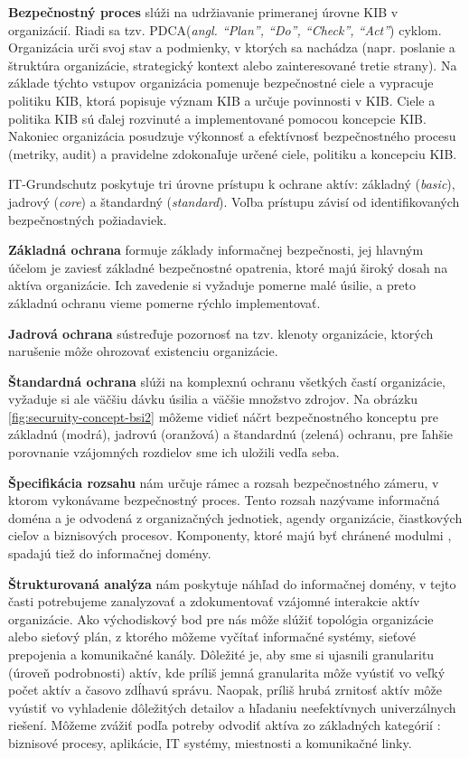 \textbf{Bezpečnostný proces} slúži na udržiavanie primeranej úrovne KIB v organizácií. Riadi sa tzv.
PDCA(\emph{angl. “Plan”, “Do”, “Check”, “Act”}) cyklom. Organizácia urči svoj stav a podmienky,
v ktorých sa nachádza (napr. poslanie a štruktúra organizácie, strategický kontext alebo zainteresované
tretie strany). Na základe týchto vstupov organizácia pomenuje bezpečnostné ciele a vypracuje politiku KIB, ktorá popisuje
význam KIB a určuje povinnosti v KIB. Ciele a politika KIB sú ďalej rozvinuté a implementované pomocou koncepcie KIB.
Nakoniec organizácia posudzuje výkonnosť a efektívnosť bezpečnostného procesu (metriky, audit) a pravidelne zdokonaľuje určené
ciele, politiku a koncepciu KIB.

IT-Grundschutz poskytuje tri úrovne prístupu k ochrane aktív: základný (\emph{basic}), jadrový (\emph{core}) a štandardný
(\emph{standard}). Voľba prístupu závisí od identifikovaných bezpečnostných požiadaviek.

\textbf{Základná ochrana} formuje základy informačnej bezpečnosti, jej hlavným účelom je zaviesť základné bezpečnostné opatrenia,
ktoré majú široký dosah na aktíva organizácie. Ich zavedenie si vyžaduje pomerne malé úsilie, a preto základnú ochranu vieme
pomerne rýchlo implementovať. 

\textbf{Jadrová ochrana} sústreďuje pozornosť na tzv. klenoty organizácie, ktorých narušenie môže ohrozovať existenciu organizácie. 

\textbf{Štandardná ochrana} slúži na komplexnú ochranu všetkých častí organizácie, vyžaduje si ale väčšiu dávku úsilia a
väčšie množstvo zdrojov. Na obrázku \ref{fig:securuity-concept-bsi2} môžeme vidieť náčrt bezpečnostného konceptu pre
{\color{NavyBlue}základnú (modrá)}, {\color{Orange}jadrovú (oranžová)} a {\color{Green}štandardnú (zelená)} ochranu,
pre ľahšie porovnanie vzájomných rozdielov sme ich uložili vedľa seba.



\textbf{Špecifikácia rozsahu} nám určuje rámec a rozsah bezpečnostného zámeru, v ktorom vykonávame bezpečnostný proces. Tento rozsah nazývame
informačná doména a je odvodená z organizačných jednotiek, agendy organizácie, čiastkových cieľov a biznisových procesov. Komponenty,
ktoré majú byť chránené modulmi \cite{GSK}, spadajú tiež do informačnej domény.

\textbf{Štrukturovaná analýza} nám poskytuje náhľad do informačnej domény, v tejto časti potrebujeme zanalyzovať a zdokumentovať vzájomné interakcie
aktív organizácie. Ako východiskový bod pre nás môže slúžiť topológia organizácie alebo sieťový plán, z ktorého môžeme vyčítať informačné
systémy, sieťové prepojenia a komunikačné kanály. Dôležité je, aby sme si ujasnili granularitu (úroveň podrobnosti) aktív, kde príliš jemná granularita
môže vyústiť vo veľký počet aktív a časovo zdĺhavú správu. Naopak, príliš hrubá zrnitosť aktív môže vyústiť vo vyhladenie dôležitých detailov a hľadaniu
neefektívnych univerzálnych riešení. Môžeme zvážiť podľa potreby odvodiť aktíva zo základných kategórií \cite{GSK}: biznisové procesy, aplikácie,
IT systémy, miestnosti a komunikačné linky.

